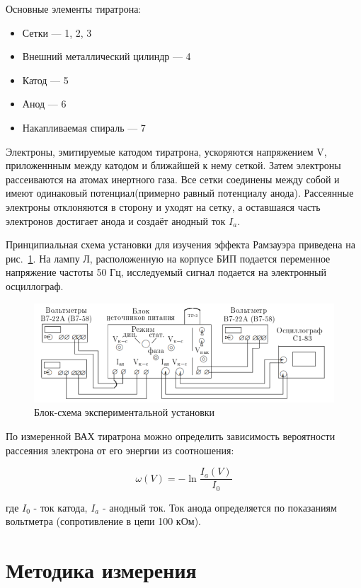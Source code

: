 \documentclass[reprint, nofootinbib, nobalancelastpage, 10pt]{revtex4-2}
\begin{document}
Основные элементы тиратрона:

\begin{itemize}
	\item Сетки --- 1, 2, 3
	\item Внешний металлический цилиндр --- 4
	\item Катод --- 5
	\item Анод --- 6
	\item Накапливаемая спираль --- 7
\end{itemize}

Электроны, эмитируемые катодом тиратрона, ускоряются напряжением V, приложеннным между
катодом и ближайшей к нему сеткой. Затем электроны рассеиваются на атомах инертного газа.
Все сетки соединены между собой и имеют одинаковый потенциал(примерно равный потенциалу анода).
Рассеянные электроны отклоняются в сторону и уходят на сетку, а оставшаяся часть электронов
достигает анода и создаёт анодный ток $I_a$.

Принципиальная схема установки для изучения эффекта Рамзауэра приведена на рис.~\ref{img:pic5}.
На лампу Л, расположенную на корпусе БИП подается переменное напряжение частоты 50 Гц,
исследуемый сигнал подается на электронный осциллограф.

\begin{figure}[h!]
	\includegraphics[width = \linewidth]{pic_6.png}
	\caption{Блок-схема экспериментальной установки}
	\label{img:pic5}
\end{figure}

По измеренной ВАХ тиратрона можно определить зависимость вероятности рассеяния электрона
от его энергии из соотношения:

\begin{equation}
	\label{eq:w}
	\omega(V) = -\ln\frac{I_a(V)}{I_0}
\end{equation}

где $I_0$ - ток катода, $I_a$ - анодный ток. Ток анода определяется по показаниям
вольтметра (сопротивление в цепи 100 кОм).


\section*{Методика измерения}
\end{document}
